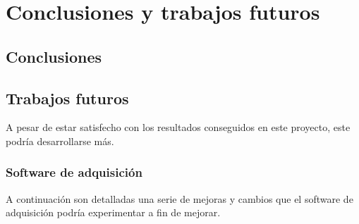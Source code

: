 \chapter{Conclusiones y trabajos futuros}
\label{cap_conclusiones}


\section{Conclusiones}

\section{Trabajos futuros}
	A pesar de estar satisfecho con los resultados conseguidos en este proyecto, este podría desarrollarse más.
	\subsection{Software de adquisición}
		A continuación son detalladas una serie de mejoras y cambios que el software de adquisición podría experimentar a fin de mejorar.
